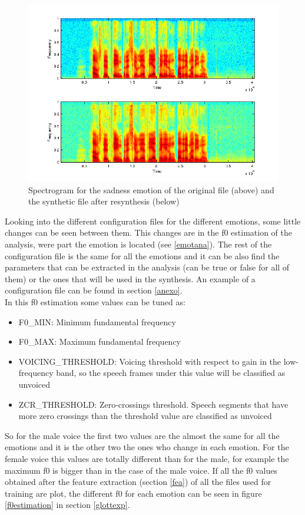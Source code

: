 \begin{figure}[!htb]
	\begin{center}
	\includegraphics[width=1\textwidth]{img/spectro-sad.png}
	\end{center}
	\caption{\label{sadspec}Spectrogram for the sadness emotion of the original file (above) and the synthetic file after resynthesis (below)}
\end{figure}
Looking into the different configuration files for the different emotions, some little changes can be seen between them. This changes are in the f0 estimation of the analysis, were part the emotion is located (see \ref{emotana}). The rest of the configuration file is the same for all the emotions and it can be also find the parameters that can be extracted in the analysis (can be true or false for all of them) or the ones that will be used in the synthesis. An example of a configuration file can be found in section \ref{anexo}.\\
In this f0 estimation some values can be tuned as:
\begin{itemize}
\item F0\_MIN: Minimum fundamental frequency
\item F0\_MAX: Maximum fundamental frequency
\item VOICING\_THRESHOLD: Voicing threshold with respect to gain in the low-frequency band, so the speech frames under this value will be classified as unvoiced
\item ZCR\_THRESHOLD: Zero-crossings threshold. Speech segments that have more zero crossings than the threshold value are classified as unvoiced
\end{itemize}
So for the male voice the first two values are the almost the same for all the emotions and it is the other two the ones who change in each emotion.
For the female voice this values are totally different than for the male, for example the maximum f0 is bigger than in the case of the male voice.
If all the f0 values obtained after the feature extraction (section \ref{fea}) of all the files used for training are plot, the different f0 for each emotion can be seen in figure \ref{f0estimation} in section \ref{glottexp}.
